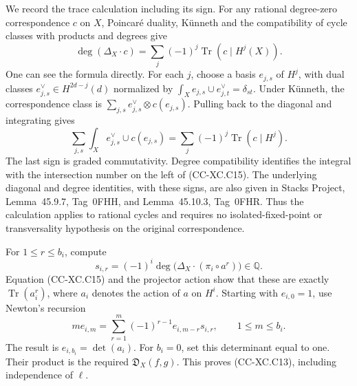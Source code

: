 We record the trace calculation including its sign.
For any rational degree-zero correspondence \(c\) on \(X\),
Poincaré duality, Künneth and the compatibility of cycle
classes with products and degrees give
\[
 \deg(\Delta_X\cdot c)
                  =\sum_j(-1)^j\operatorname{Tr}(c\mid H^j(X)).
                                                        \tag{CC-XC.C15}
\]
One can see the formula directly.  For each \(j\), choose
a basis \(e_{j,s}\) of \(H^j\), with dual classes
\(e^\vee_{j,s}\in H^{2d-j}(d)\) normalized by
\(\int_X e_{j,s}\cup e^\vee_{j,t}=\delta_{st}\).
Under Künneth, the correspondence class is
\(\sum_{j,s}e^\vee_{j,s}\otimes c(e_{j,s})\).
Pulling back to the diagonal and integrating gives
\[
 \sum_{j,s}\int_X e^\vee_{j,s}\cup c(e_{j,s})
                    =\sum_j(-1)^j\operatorname{Tr}(c\mid H^j).
 \]
The last sign is graded commutativity.  Degree compatibility
identifies the integral with the intersection number on the
left of (CC-XC.C15).  The underlying diagonal and degree
identities, with these signs, are also given in Stacks
Project, Lemma~45.9.7, Tag~0FHH, and Lemma~45.10.3,
Tag~0FHR.  Thus the calculation applies to rational cycles
and requires no isolated-fixed-point or transversality
hypothesis on the original correspondence.

For \(1\le r\le b_i\), compute
\[
 s_{i,r}=(-1)^i\deg\bigl(\Delta_X\cdot(\pi_i\circ a^r)\bigr)
                         \in\mathbb Q.                  \tag{CC-XC.C16}
\]
Equation (CC-XC.C15) and the projector action show that these
are exactly \(\operatorname{Tr}(a_i^r)\), where \(a_i\)
denotes the action of \(a\) on \(H^i\).
Starting with \(e_{i,0}=1\), use Newton's recursion
\[
 m e_{i,m}=
      \sum_{r=1}^{m}(-1)^{r-1}e_{i,m-r}s_{i,r},
                 \qquad 1\le m\le b_i.                 \tag{CC-XC.C17}
\]
The result is \(e_{i,b_i}=\det(a_i)\).
For \(b_i=0\), set this determinant equal to one.
Their product is the required \(\mathfrak D_X(f,g)\).
This proves (CC-XC.C13), including independence of \(\ell\).

